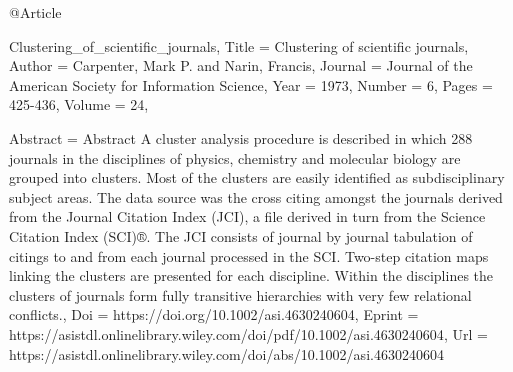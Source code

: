 @Article{Clustering_of_scientific_journals,
  Title                    = {Clustering of scientific journals},
  Author                   = {Carpenter, Mark P. and Narin, Francis},
  Journal                  = {Journal of the American Society for Information Science},
  Year                     = {1973},
  Number                   = {6},
  Pages                    = {425-436},
  Volume                   = {24},

  Abstract                 = {Abstract A cluster analysis procedure is described in which 288 journals in the disciplines of physics, chemistry and molecular biology are grouped into clusters. Most of the clusters are easily identified as subdisciplinary subject areas. The data source was the cross citing amongst the journals derived from the Journal Citation Index (JCI), a file derived in turn from the Science Citation Index (SCI)®. The JCI consists of journal by journal tabulation of citings to and from each journal processed in the SCI. Two-step citation maps linking the clusters are presented for each discipline. Within the disciplines the clusters of journals form fully transitive hierarchies with very few relational conflicts.},
  Doi                      = {https://doi.org/10.1002/asi.4630240604},
  Eprint                   = {https://asistdl.onlinelibrary.wiley.com/doi/pdf/10.1002/asi.4630240604},
  Url                      = {https://asistdl.onlinelibrary.wiley.com/doi/abs/10.1002/asi.4630240604}
}

